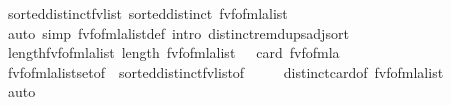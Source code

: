 \begin{isabellebody}
\endisatagproof
{\isafoldproof}%
%
\isadelimproof
\isanewline
%
\endisadelimproof
\isanewline
{}\isamarkupfalse%
\ sorted{\isacharunderscore}{\kern0pt}distinct{\isacharunderscore}{\kern0pt}fv{\isacharunderscore}{\kern0pt}list{\isacharcolon}{\kern0pt}\ {\isachardoublequoteopen}sorted{\isacharunderscore}{\kern0pt}distinct\ {\isacharparenleft}{\kern0pt}fv{\isacharunderscore}{\kern0pt}fo{\isacharunderscore}{\kern0pt}fmla{\isacharunderscore}{\kern0pt}list\ {\isasymphi}{\isacharparenright}{\kern0pt}{\isachardoublequoteclose}\isanewline
%
\isadelimproof
\ \ %
\endisadelimproof
%
\isatagproof
{}\isamarkupfalse%
\ {\isacharparenleft}{\kern0pt}auto\ simp{\isacharcolon}{\kern0pt}\ fv{\isacharunderscore}{\kern0pt}fo{\isacharunderscore}{\kern0pt}fmla{\isacharunderscore}{\kern0pt}list{\isacharunderscore}{\kern0pt}def\ intro{\isacharcolon}{\kern0pt}\ distinct{\isacharunderscore}{\kern0pt}remdups{\isacharunderscore}{\kern0pt}adj{\isacharunderscore}{\kern0pt}sort{\isacharparenright}{\kern0pt}%
\endisatagproof
{\isafoldproof}%
%
\isadelimproof
\isanewline
%
\endisadelimproof
\isanewline
{}\isamarkupfalse%
\ length{\isacharunderscore}{\kern0pt}fv{\isacharunderscore}{\kern0pt}fo{\isacharunderscore}{\kern0pt}fmla{\isacharunderscore}{\kern0pt}list{\isacharcolon}{\kern0pt}\ {\isachardoublequoteopen}length\ {\isacharparenleft}{\kern0pt}fv{\isacharunderscore}{\kern0pt}fo{\isacharunderscore}{\kern0pt}fmla{\isacharunderscore}{\kern0pt}list\ {\isasymphi}{\isacharparenright}{\kern0pt}\ {\isacharequal}{\kern0pt}\ card\ {\isacharparenleft}{\kern0pt}fv{\isacharunderscore}{\kern0pt}fo{\isacharunderscore}{\kern0pt}fmla\ {\isasymphi}{\isacharparenright}{\kern0pt}{\isachardoublequoteclose}\isanewline
%
\isadelimproof
\ \ %
\endisadelimproof
%
\isatagproof
{}\isamarkupfalse%
\ fv{\isacharunderscore}{\kern0pt}fo{\isacharunderscore}{\kern0pt}fmla{\isacharunderscore}{\kern0pt}list{\isacharunderscore}{\kern0pt}set{\isacharbrackleft}{\kern0pt}of\ {\isasymphi}{\isacharbrackright}{\kern0pt}\ sorted{\isacharunderscore}{\kern0pt}distinct{\isacharunderscore}{\kern0pt}fv{\isacharunderscore}{\kern0pt}list{\isacharbrackleft}{\kern0pt}of\ {\isasymphi}{\isacharbrackright}{\kern0pt}\isanewline
\ \ \ \ distinct{\isacharunderscore}{\kern0pt}card{\isacharbrackleft}{\kern0pt}of\ {\isachardoublequoteopen}fv{\isacharunderscore}{\kern0pt}fo{\isacharunderscore}{\kern0pt}fmla{\isacharunderscore}{\kern0pt}list\ {\isasymphi}{\isachardoublequoteclose}{\isacharbrackright}{\kern0pt}\isanewline
\ \ \isamarkupfalse%
\ auto%
\endisatagproof
{\isafoldproof}%

\end{isabellebody}
